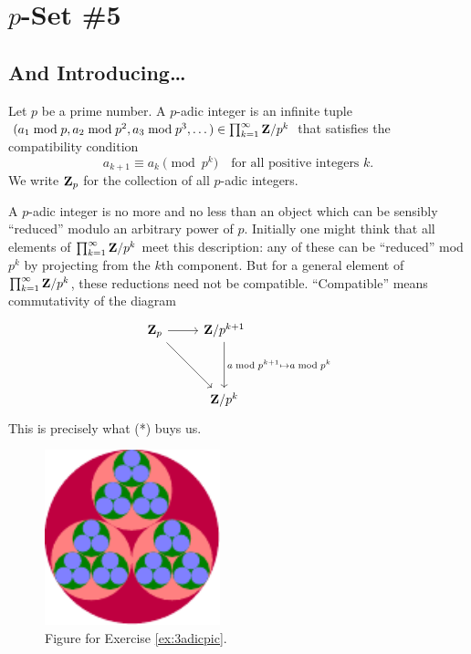 %
%
%
\chapter*{$p$-Set \#5}

\section*{And Introducing\dots }


Let $p$ be a prime number. A \textsf{$p$-adic integer} is an infinite tuple $(a_1\bmod{p}, a_2\bmod{p^2}, a_3\bmod{p^3}, \dots) \in \prod_{k=1}^{\infty} \mathbf{Z}/p^k$ that satisfies the compatibility condition
\begin{equation}\tag{*} a_{k+1}\equiv a_k \pmod{p^k} \quad\text{for all positive integers $k$}.\end{equation}
We write $\mathbf{Z}_p$ for the collection of all $p$-adic integers.

A $p$-adic integer is no more and no less than an object which can be sensibly ``reduced'' modulo an arbitrary power of $p$. Initially one might think that all elements of $\prod_{k=1}^{\infty} \mathbf{Z}/p^k$ meet this description: any of these can be ``reduced'' mod $p^k$ by projecting from the $k$th component. But for a general element of $\prod_{k=1}^{\infty} \mathbf{Z}/p^k$, these reductions need not be compatible. ``Compatible'' means commutativity of the diagram
\[
\begin{tikzcd}
\Z_p \arrow[r] \arrow[rdd] & \Z/p^{k+1}\arrow[dd,"a\bmod{p^{k+1}}\mapsto a\bmod{p^k}"]\\
 &  \\
 & \Z/p^k
\end{tikzcd}
\]
This is precisely what (*) buys us.
\begin{figure}
\centering
\includegraphics[width=2.0in]{3adicpic.pdf}
\caption*{Figure for Exercise \ref{ex:3adicpic}.}
\end{figure}

